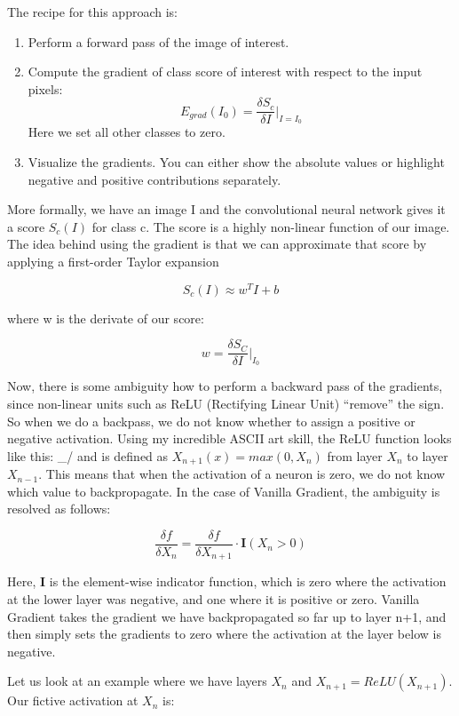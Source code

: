 \documentclass[
  11pt,
]{scrbook}
\providecommand{\tightlist}{%
  \setlength{\itemsep}{0pt}\setlength{\parskip}{0pt}}
\begin{document}
The recipe for this approach is:

\begin{enumerate}
\def\labelenumi{\arabic{enumi}.}
\tightlist
\item
  Perform a forward pass of the image of interest.
\item
  Compute the gradient of class score of interest with respect to the input pixels:
  \[E_{grad}(I_0)=\frac{\delta{}S_c}{\delta{}I}|_{I=I_0}\]
  Here we set all other classes to zero.
\item
  Visualize the gradients. You can either show the absolute values or highlight negative and positive contributions separately.
\end{enumerate}

More formally, we have an image I and the convolutional neural network gives it a score \(S_c(I)\) for class c.
The score is a highly non-linear function of our image.
The idea behind using the gradient is that we can approximate that score by applying a first-order Taylor expansion

\[S_c(I)\approx{}w^T{}I+b\]

where w is the derivate of our score:

\[w = \frac{\delta S_C}{\delta I}|_{I_0}\]

Now, there is some ambiguity how to perform a backward pass of the gradients, since non-linear units such as ReLU (Rectifying Linear Unit) ``remove'' the sign.
So when we do a backpass, we do not know whether to assign a positive or negative activation.
Using my incredible ASCII art skill, the ReLU function looks like this: \_/ and is defined as \(X_{n+1}(x)=max(0,X_n)\) from layer \(X_n\) to layer \(X_{n-1}\).
This means that when the activation of a neuron is zero, we do not know which value to backpropagate.
In the case of Vanilla Gradient, the ambiguity is resolved as follows:

\[\frac{\delta f}{\delta X_n} = \frac{\delta f}{\delta X_{n+1}} \cdot \mathbf{I}(X_n > 0)\]

Here, \(\mathbf{I}\) is the element-wise indicator function, which is zero where the activation at the lower layer was negative, and one where it is positive or zero.
Vanilla Gradient takes the gradient we have backpropagated so far up to layer n+1, and then simply sets the gradients to zero where the activation at the layer below is negative.

Let us look at an example where we have layers \(X_n\) and \(X_{n+1}=ReLU(X_{n+1})\).
Our fictive activation at \(X_n\) is:
\end{document}
